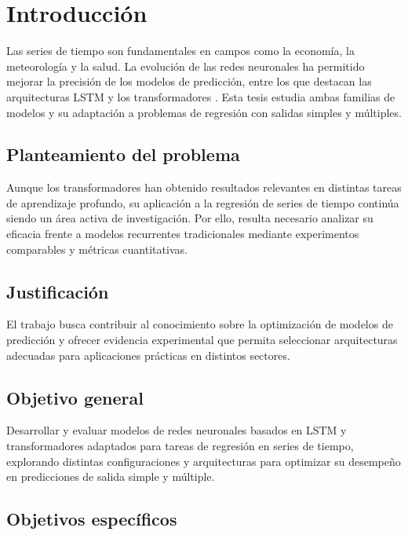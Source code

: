 \chapter{Introducción}

Las series de tiempo son fundamentales en campos como la economía, la meteorología y la salud. La evolución de las redes neuronales ha permitido mejorar la precisión de los modelos de predicción, entre los que destacan las arquitecturas LSTM \cite{hochreiter1997lstm} y los transformadores \cite{vaswani2017attention}. Esta tesis estudia ambas familias de modelos y su adaptación a problemas de regresión con salidas simples y múltiples.

\section{Planteamiento del problema}

Aunque los transformadores han obtenido resultados relevantes en distintas tareas de aprendizaje profundo, su aplicación a la regresión de series de tiempo continúa siendo un área activa de investigación. Por ello, resulta necesario analizar su eficacia frente a modelos recurrentes tradicionales mediante experimentos comparables y métricas cuantitativas.

\section{Justificación}

El trabajo busca contribuir al conocimiento sobre la optimización de modelos de predicción y ofrecer evidencia experimental que permita seleccionar arquitecturas adecuadas para aplicaciones prácticas en distintos sectores.

\section{Objetivo general}

Desarrollar y evaluar modelos de redes neuronales basados en LSTM y transformadores adaptados para tareas de regresión en series de tiempo, explorando distintas configuraciones y arquitecturas para optimizar su desempeño en predicciones de salida simple y múltiple.

\section{Objetivos específicos}

